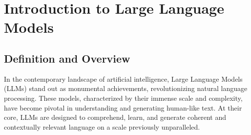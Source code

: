 

\chapter{Introduction to Large Language Models}
\label{ch:introduction}


\section{Definition and Overview}
\label{sec:definition-and-overview}

In the contemporary landscape of artificial intelligence, Large Language Models (LLMs) stand out as monumental achievements, revolutionizing natural language processing.
These models, characterized by their immense scale and complexity, have become pivotal in understanding and generating human-like text.
At their core, LLMs are designed to comprehend, learn, and generate coherent and contextually relevant language on a scale previously unparalleled.

